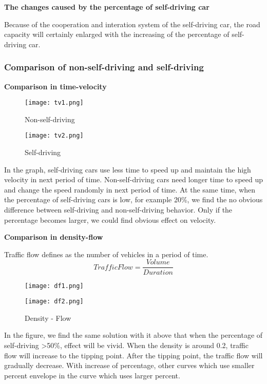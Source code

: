 \documentclass{mcmthesis}
\numberwithin{equation}{section}
\begin{document}
				\noindent \textbf{The changes caused by the percentage of self-driving car}

					Because of the cooperation and interation system of the self-driving car, the road capacity will certainly enlarged with the increasing of the percentage of self-driving car.


			\subsubsection{Comparison of non-self-driving and self-driving}
				\noindent \textbf{Comparison in time-velocity}
					\begin{figure}[H]
						\begin{minipage}[H]{0.5\linewidth}
							\centering
							\texttt{[image: tv1.png]}
							\caption{Non-self-driving}
						\end{minipage}%
						\begin{minipage}[H]{0.5\linewidth}
							\centering
							\texttt{[image: tv2.png]}
							\caption{Self-driving}
						\end{minipage}
					\end{figure}
					In the graph, self-driving cars use less time to speed up and maintain the high velocity in next period of time. Non-self-driving cars need longer time to speed up and change the speed randomly in next period of time. At the same time, when the percentage of self-driving cars is low, for example 20\%, we find the no obvious difference between self-driving and non-self-driving behavior. Only if the percentage becomes larger, we could find obvious effect on velocity.

				\noindent \textbf{Comparison in density-flow}

					Traffic flow defines as the number of vehicles in a period of time.
					\begin{equation}
						Traffic Flow = \frac{Volume}{Duration}
					\end{equation}
					\begin{figure}[H]
						\begin{minipage}[H]{0.5\linewidth}
							\centering
							\texttt{[image: df1.png]}
						\end{minipage}%
						\begin{minipage}[H]{0.5\linewidth}
							\centering
							\texttt{[image: df2.png]}
						\end{minipage}
						\caption{Density - Flow}
					\end{figure}
					In the figure, we find the same solution with it above that when the percentage of self-driving >50\%, effect will be vivid. When the density is around 0.2, traffic flow will increase to the tipping point. After the tipping point, the traffic flow will gradually decrease. With increase of percentage, other curves which use smaller percent envelope in the curve which uses larger percent.
\end{document}
